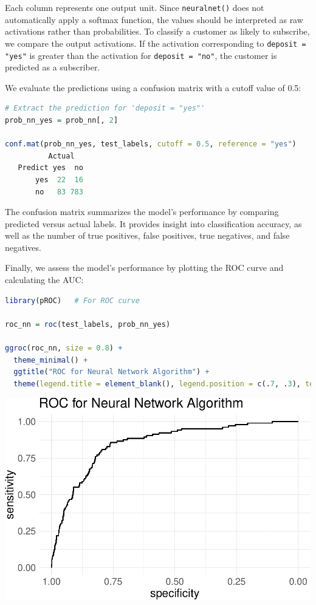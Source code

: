 \documentclass[
]{book}
\newcommand{\passthrough}[1]{#1}
\theoremstyle{definition}
\theoremstyle{definition}
\theoremstyle{definition}
\theoremstyle{definition}
\theoremstyle{remark}
\begin{document}
Each column represents one output unit. Since \passthrough{\lstinline!neuralnet()!} does not automatically apply a softmax function, the values should be interpreted as raw activations rather than probabilities. To classify a customer as likely to subscribe, we compare the output activations. If the activation corresponding to \passthrough{\lstinline!deposit = "yes"!} is greater than the activation for \passthrough{\lstinline!deposit = "no"!}, the customer is predicted as a subscriber.

We evaluate the predictions using a confusion matrix with a cutoff value of 0.5:

\begin{lstlisting}[language=R]
# Extract the prediction for 'deposit = "yes"'
prob_nn_yes = prob_nn[, 2] 

conf.mat(prob_nn_yes, test_labels, cutoff = 0.5, reference = "yes")
          Actual
   Predict yes  no
       yes  22  16
       no   83 783
\end{lstlisting}

The confusion matrix summarizes the model's performance by comparing predicted versus actual labels. It provides insight into classification accuracy, as well as the number of true positives, false positives, true negatives, and false negatives.

Finally, we assess the model's performance by plotting the ROC curve and calculating the AUC:

\begin{lstlisting}[language=R]
library(pROC)   # For ROC curve

roc_nn = roc(test_labels, prob_nn_yes)

ggroc(roc_nn, size = 0.8) + 
  theme_minimal() + 
  ggtitle("ROC for Neural Network Algorithm") +
  theme(legend.title = element_blank(), legend.position = c(.7, .3), text = element_text(size = 17))
\end{lstlisting}

\begin{center}\includegraphics[width=0.7\linewidth]{nn_files/figure-latex/unnamed-chunk-14-1} \end{center}
\end{document}
